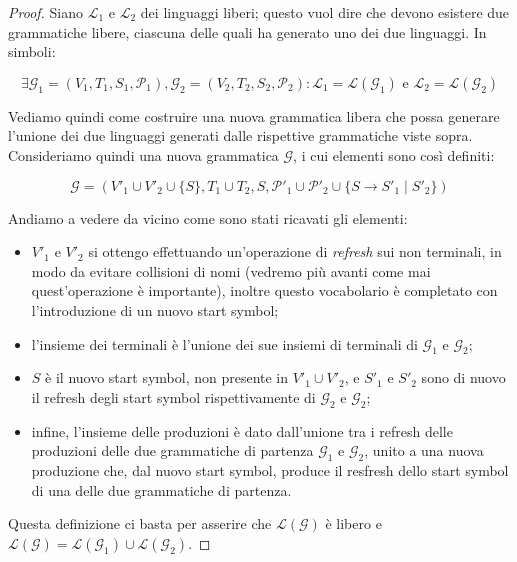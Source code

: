\documentclass[class=book, crop=false, oneside, 12pt]{standalone}
\begin{document}
\begin{proof}
    Siano \(\mathcal{L}_1\) e \(\mathcal{L}_2\) dei linguaggi liberi; questo vuol dire che devono esistere due grammatiche libere, ciascuna delle quali ha generato uno dei due linguaggi. In simboli:

  \begin{equation*}
    \exists \mathcal{G}_1 = (V_1, T_1, S_1, \mathcal{P}_1), \mathcal{G}_2 = (V_2, T_2, S_2, \mathcal{P}_2) : \mathcal{L}_1 = \mathcal{L}(\mathcal{G}_1) \textrm{ e } \mathcal{L}_2 = \mathcal{L}(\mathcal{G}_2)
  \end{equation*}

  Vediamo quindi come costruire una nuova grammatica libera che possa generare l'unione dei due linguaggi generati dalle rispettive grammatiche viste sopra. Consideriamo quindi una nuova grammatica \(\mathcal{G}\), i cui elementi sono così definiti:

  \begin{equation*}
      \mathcal{G} = (V'_1 \cup V'_2 \cup \{S\}, T_1 \cup T_2, S, \mathcal{P}'_1 \cup \mathcal{P}'_2 \cup \{S \rightarrow S'_1 \mid S'_2\})
  \end{equation*}

  \noindent Andiamo a vedere da vicino come sono stati ricavati gli elementi:

  \begin{itemize}
    \item \(V'_1\) e \(V'_2\) si ottengo effettuando un'operazione di \emph{refresh} sui non terminali, in modo da evitare collisioni di nomi (vedremo più avanti come mai quest'operazione è importante), inoltre questo vocabolario è completato con l'introduzione di un nuovo start symbol;
    \item l'insieme dei terminali è l'unione dei sue insiemi di terminali di \(\mathcal{G}_1\) e \(\mathcal{G}_2\);
    \item \(S\) è il nuovo start symbol, non presente in \(V'_1 \cup V'_2\), e \(S'_1\) e \(S'_2\) sono di nuovo il refresh degli start symbol rispettivamente di \(\mathcal{G}_2\) e \(\mathcal{G}_2\);
    \item infine, l'insieme delle produzioni è dato dall'unione tra i refresh delle produzioni delle due grammatiche di partenza  \(\mathcal{G}_1\) e \(\mathcal{G}_2\), unito a una nuova produzione che, dal nuovo start symbol, produce il resfresh dello start symbol di una delle due grammatiche di partenza.
  \end{itemize}

  \noindent Questa definizione ci basta per asserire che \(\mathcal{L(G)}\) è libero e \(\mathcal{L(G)} = \mathcal{L}(\mathcal{G}_1)  \cup \mathcal{L}(\mathcal{G}_2) \).

\end{proof}
\end{document}
